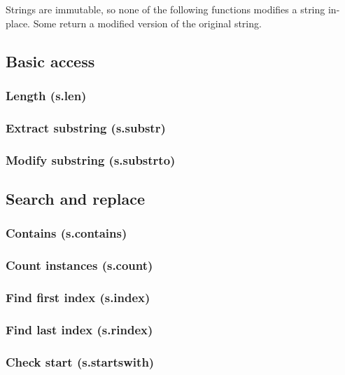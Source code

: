 \documentclass{article}
\theoremstyle{definition}
\begin{document}
Strings are immutable, so none of the following functions modifies a string in-place.  Some return a modified version of the original string.

\subsection{Basic access}

\subsubsection{Length (s.len)}

\subsubsection{Extract substring (s.substr)}

\subsubsection{Modify substring (s.substrto)}

\subsection{Search and replace}

\subsubsection{Contains (s.contains)}

\subsubsection{Count instances (s.count)}

\subsubsection{Find first index (s.index)}

\subsubsection{Find last index (s.rindex)}

\subsubsection{Check start (s.startswith)}
\end{document}
